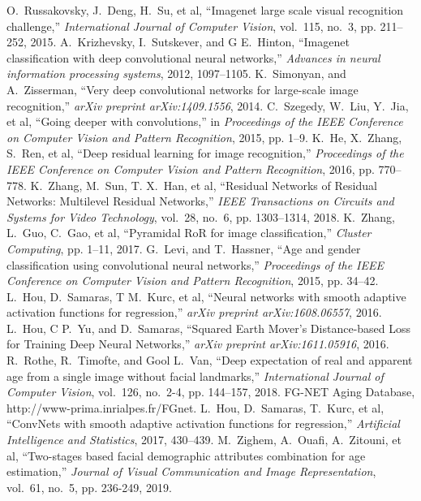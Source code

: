\documentclass[journal]{IEEEtran}
\begin{document}
\begin{thebibliography}{1}
O.~Russakovsky, J.~Deng, H.~Su, et al, ``Imagenet large scale visual recognition challenge,'' \emph{International Journal of Computer Vision}, vol.~115, no.~3, pp. 211--252, 2015.
A.~Krizhevsky, I.~Sutskever, and G E.~Hinton, ``Imagenet classification with deep convolutional neural networks,'' \emph{Advances in neural information processing systems}, 2012, 1097--1105.
K.~Simonyan, and A.~Zisserman, ``Very deep convolutional networks for large-scale image recognition,'' \emph{arXiv preprint arXiv:1409.1556}, 2014.
C.~Szegedy, W.~Liu, Y.~Jia, et al, ``Going deeper with convolutions,'' in \emph{Proceedings of the IEEE Conference on Computer Vision and Pattern Recognition}, 2015, pp. 1--9.
K.~He, X.~Zhang, S.~Ren, et al, ``Deep residual learning for image recognition,'' \emph{Proceedings of the IEEE Conference on Computer Vision and Pattern Recognition}, 2016, pp. 770--778.
K.~Zhang, M.~Sun, T. X.~Han, et al, ``Residual Networks of Residual Networks: Multilevel Residual Networks,'' \emph{IEEE Transactions on Circuits and Systems for Video Technology}, vol.~28, no.~6, pp. 1303--1314, 2018.
K.~Zhang, L.~Guo, C.~Gao, et al, ``Pyramidal RoR for image classification,'' \emph{Cluster Computing}, pp. 1--11, 2017.
G.~Levi, and T.~Hassner, ``Age and gender classification using convolutional neural networks,'' \emph{Proceedings of the IEEE Conference on Computer Vision and Pattern Recognition}, 2015, pp. 34--42.
L.~Hou, D.~Samaras, T M.~Kurc, et al, ``Neural networks with smooth adaptive activation functions for regression,'' \emph{arXiv preprint arXiv:1608.06557}, 2016.
L.~Hou, C P.~Yu, and D.~Samaras, ``Squared Earth Mover's Distance-based Loss for Training Deep Neural Networks,'' \emph{arXiv preprint arXiv:1611.05916}, 2016.
R.~Rothe, R.~Timofte, and Gool L.~Van, ``Deep expectation of real and apparent age from a single image without facial landmarks,'' \emph{International Journal of Computer Vision}, vol.~126, no.~2-4, pp. 144--157, 2018.
FG-NET Aging Database, http://www-prima.inrialpes.fr/FGnet.
L.~Hou, D.~Samaras, T.~Kurc, et al, ``ConvNets with smooth adaptive activation functions for regression,'' \emph{Artificial Intelligence and Statistics}, 2017, 430--439.
M.~Zighem, A.~Ouafi, A.~Zitouni, et al, ``Two-stages based facial demographic attributes combination for age estimation,'' \emph{Journal of Visual Communication and Image Representation}, vol.~61, no.~5, pp. 236-249, 2019.

\end{thebibliography}
\end{document}
